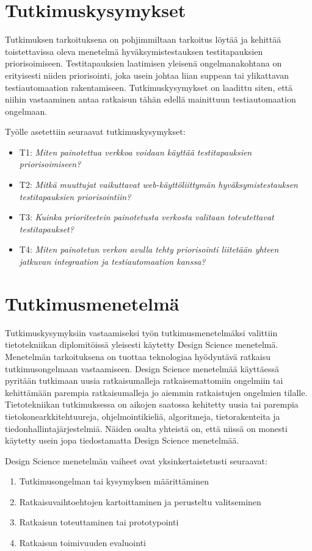 \section{Tutkimuskysymykset} \label{06_tutkimuskysymykset}

Tutkimuksen tarkoituksena on pohjimmiltaan tarkoitus löytää ja kehittää toistettavissa oleva menetelmä hyväksymistestauksen testitapauksien priorisoimiseen.
Testitapauksien laatimisen yleisenä ongelmanakohtana on erityisesti niiden priorisointi, joka usein johtaa liian suppean tai ylikattavan testiautomaation rakentamiseen.
Tutkimuskysymykset on laadittu siten, että niihin vastaaminen antaa ratkaisun tähän edellä mainittuun testiautomaation ongelmaan.

Työlle asetettiin seuraavat tutkimuskysymykset:
\begin{itemize}
  \item T1: \emph{Miten painotettua verkkoa voidaan käyttää testitapauksien priorisoimiseen?}
  \item T2: \emph{Mitkä muuttujat vaikuttavat web-käyttöliittymän hyväksymistestauksen testitapauksien priorisointiin?}
  \item T3: \emph{Kuinka prioriteetein painotetusta verkosta valitaan toteutettavat testitapaukset?}
  \item T4: \emph{Miten painotetun verkon avulla tehty priorisointi liitetään yhteen jatkuvan integraation ja testiautomaation kanssa?}
\end{itemize}

\section{Tutkimusmenetelmä} \label{06_tutkimusmenetelma}

Tutkimuskysymyksiin vastaamiseksi työn tutkimusmenetelmäksi valittiin tietotekniikan diplomitöissä yleisesti käytetty Design Science menetelmä.
Menetelmän tarkoituksena on tuottaa teknologiaa hyödyntävä ratkaisu tutkimusongelmaan vastaamiseen.
Design Science menetelmää käyttäessä pyritään tutkimaan uusia ratkaisumalleja ratkaisemattomiin ongelmiin tai kehittämään parempia ratkaisumalleja jo aiemmin ratkaistujen ongelmien tilalle.
Tietotekniikan tutkimuksessa on aikojen saatossa kehitetty uusia tai parempia tietokonearkkitehtuureja, ohjelmointikieliä, algoritmeja, tietorakenteita ja tiedonhallintajärjestelmiä.
Näiden osalta yhteistä on, että niissä on monesti käytetty usein jopa tiedostamatta Design Science menetelmää.

Design Science menetelmän vaiheet ovat yksinkertaistetusti seuraavat:
\begin{enumerate}
  \item Tutkimusongelman tai kysymyksen määrittäminen
  \item Ratkaisuvaihtoehtojen kartoittaminen ja perusteltu valitseminen
  \item Ratkaisun toteuttaminen tai prototypointi
  \item Ratkaisun toimivuuden evaluointi
\end{enumerate}

